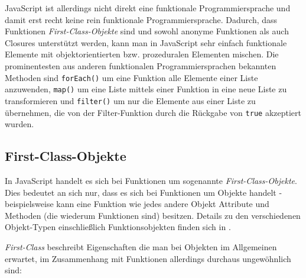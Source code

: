 \begin{description}
JavaScript ist allerdings nicht direkt eine funktionale Programmiersprache und damit erst recht
keine rein funktionale Programmiersprache. Dadurch, dass Funktionen \emph{First-Class-Objekte} sind
und sowohl anonyme Funktionen als auch Closures unterstützt werden, kann man in JavaScript sehr
einfach funktionale Elemente mit objektorientierten bzw. prozeduralen Elementen mischen. Die
prominentesten aus anderen funktionalen Programmiersprachen bekannten Methoden sind
\lstinline{forEach()} um eine Funktion alle Elemente einer Liste anzuwenden, \lstinline{map()} um
eine Liste mittels einer Funktion in eine neue Liste zu transformieren und \lstinline{filter()} um
nur die Elemente aus einer Liste zu übernehmen, die von der Filter-Funktion durch die Rückgabe von
\lstinline{true} akzeptiert wurden.
\end{description}


\subsection{First-Class-Objekte}
In JavaScript handelt es sich bei Funktionen um sogenannte \emph{First-Class-Objekte}. Dies
bedeutet an sich nur, dass es sich bei Funktionen um Objekte handelt - beispielsweise kann eine
Funktion wie jedes andere Objekt Attribute und Methoden (die wiederum Funktionen sind) besitzen.
Details zu den verschiedenen Objekt-Typen einschließlich Funktionsobjekten finden sich in
\citep[Kap. 8.6]{ecmascript}.

\emph{First-Class} beschreibt Eigenschaften die man bei Objekten im Allgemeinen erwartet, im
Zusammenhang mit Funktionen allerdings durchaus ungewöhnlich sind:

